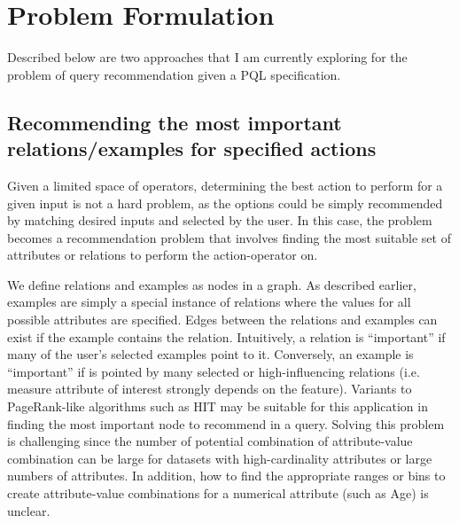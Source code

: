 \documentclass{sig-alternate-05-2015}
\begin{document}
\section{Problem Formulation}
Described below are two approaches that I am currently exploring for the problem of query recommendation given a PQL specification.
\subsection{Recommending the most important relations/examples for specified actions}
\par Given a limited space of operators, determining the best action to perform for a given input is not a hard problem, as the options could be simply recommended by matching desired inputs and selected by the user. In this case, the problem becomes a recommendation problem that involves finding the most suitable set of attributes or relations to perform the action-operator on.
\par We define relations and examples as nodes in a graph. As described earlier, examples are simply a special instance of relations where the values for all possible attributes are specified. Edges between the relations and examples can exist if the example contains the relation. Intuitively, a relation is ``important'' if many of the user's selected examples point to it. Conversely, an example is ``important'' if is pointed by many selected or high-influencing relations (i.e. measure attribute of interest strongly depends on the feature). Variants to PageRank-like algorithms such as HIT\cite{Kleinberg1999} may be suitable for this application in finding the most important node to recommend in a query. Solving this problem is challenging since the number of potential combination of attribute-value combination can be large for datasets with high-cardinality attributes or large numbers of attributes. In addition, how to find the appropriate ranges or bins to create attribute-value combinations for a numerical attribute (such as Age) is unclear.
\end{document}
